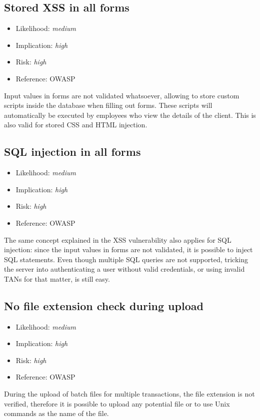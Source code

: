 \subsection{Stored XSS in all forms} \label{over:xss}
\begin{itemize}
	\item Likelihood: \textit{medium}
	\item Implication: \textit{high}
	\item Risk: \textit{high}
	\item Reference: OWASP 
\end{itemize}
Input values in forms are not validated whatsoever, allowing to store custom scripts inside the database when filling out forms. These scripts will automatically be executed by employees who view the details of the client. This is also valid for stored CSS and HTML injection.

\subsection{SQL injection in all forms} \label{over:sql}
\begin{itemize}
	\item Likelihood: \textit{medium}
	\item Implication: \textit{high}
	\item Risk: \textit{high}
	\item Reference: OWASP 
\end{itemize}
The same concept explained in the XSS vulnerability also applies for SQL injection: since the input values in forms are not validated, it is possible to inject SQL statements. Even though multiple SQL queries are not supported, tricking the server into authenticating a user without valid credentials, or using invalid TANs for that matter, is still easy.

\subsection{No file extension check during upload} \label{over:extension}
\begin{itemize}
	\item Likelihood: \textit{medium}
	\item Implication: \textit{high}
	\item Risk: \textit{high}
	\item Reference: OWASP 
\end{itemize}
During the upload of batch files for multiple transactions, the file extension is not verified, therefore it is possible to upload any potential file or to use Unix commands as the name of the file.

